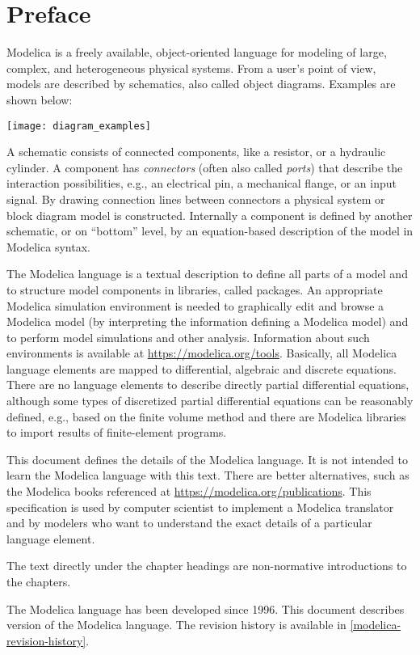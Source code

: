 \chapter*{Preface}\label{preface}

Modelica is a freely available, object-oriented language for modeling of large, complex, and heterogeneous physical systems.
From a user's point of view, models are described by schematics, also called object diagrams.
Examples are shown below:
\begin{center}
\texttt{[image: diagram\_examples]}
\end{center}

A schematic consists of connected components, like a resistor, or a hydraulic cylinder.
A component has \emph{connectors} (often also called \emph{ports}) that describe the interaction possibilities, e.g., an electrical pin, a mechanical flange, or an input signal.
By drawing connection lines between connectors a physical system or block diagram model is constructed.
Internally a component is defined by another schematic, or on ``bottom'' level, by an equation-based description of the model in Modelica syntax.

The Modelica language is a textual description to define all parts of a model and to structure model components in libraries, called packages.
An appropriate Modelica simulation environment is needed to graphically edit and browse a Modelica model (by interpreting the information defining a Modelica model) and to perform model simulations and other analysis.
Information about such environments is available at \url{https://modelica.org/tools}.
Basically, all Modelica language elements are mapped to differential, algebraic and discrete equations.
There are no language elements to describe directly partial differential equations, although some types of discretized partial differential equations can be reasonably defined, e.g., based on the finite volume method and there are Modelica libraries to import results of finite-element programs.

This document defines the details of the Modelica language.
It is not intended to learn the Modelica language with this text.
There are better alternatives, such as the Modelica books referenced at \url{https://modelica.org/publications}.
This specification is used by computer scientist to implement a Modelica translator and by modelers who want to understand the exact details of a particular language element.

The text directly under the chapter headings are non-normative introductions to the chapters.

The Modelica language has been developed since 1996.
This document describes version \mlsversion{} of the Modelica language.
The revision history is available in \cref{modelica-revision-history}.
